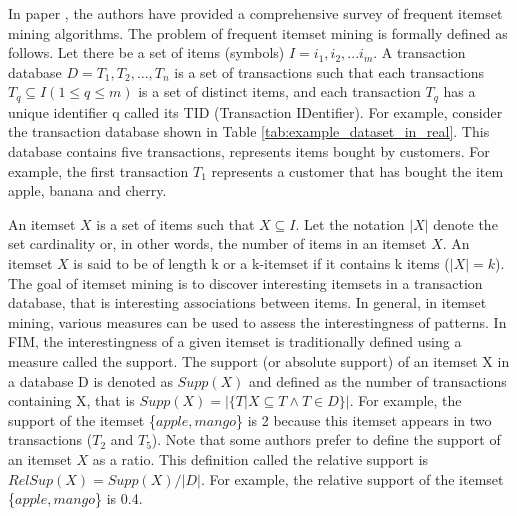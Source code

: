 In paper \cite{survey_itemset_mining}, the authors have provided a comprehensive survey of frequent itemset mining algorithms.
The problem of frequent itemset mining is formally defined as follows.
Let there be a set of items (symbols) $I = {i_1, i_2, . . . i_m}$.
A transaction database $D = {T_1, T_2, . . ., T_n}$ is a set
of transactions such that each transactions $T_q \subseteq I(1 \leq q \leq m)$ is a set of distinct items,
and each transaction $T_q$ has a unique identifier q called its TID (Transaction IDentifier).
For example, consider the transaction database shown in Table \ref{tab:example_dataset_in_real}.
This database contains
five transactions, represents items bought by customers.
For example, the first transaction $T_1$ represents a customer that has bought the item apple, banana and cherry.

An itemset $X$ is a set of items such that $X \subseteq I$. Let the notation $|X|$ denote the set
cardinality or, in other words, the number of items in an itemset $X$. An itemset $X$ is said
to be of length k or a k-itemset if it contains k items ($|X| = k$).
The goal of itemset mining is to discover interesting itemsets in a transaction database,
that is interesting associations between items.
In general, in itemset mining, various measures can be used to assess the
interestingness of patterns. In FIM, the interestingness of a given itemset is traditionally
defined using a measure called the support. The support (or absolute support) of an itemset
X in a database D is denoted as $Supp(X)$ and defined as the number of transactions containing
X, that is $Supp(X) = |\{T|X \subseteq T \wedge T \in D\}|$.
For example, the support of the itemset \{$apple, mango$\} is 2 because this itemset appears in two transactions ($T_2$ and $T_5$).
Note that some authors prefer to define the support of an itemset $X$ as a ratio. This definition called the relative
support is $RelSup(X) = Supp(X)/|D|$. For example, the relative support of the itemset \{$apple, mango$\}
is 0.4.


